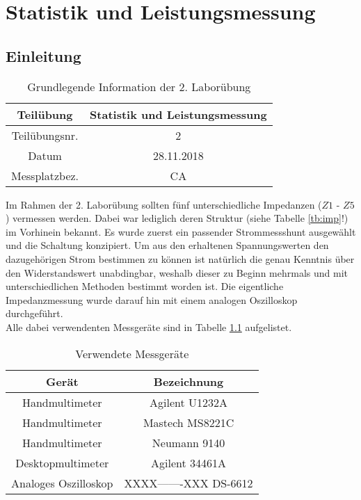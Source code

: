 \chapter{Statistik und Leistungsmessung}
\section{Einleitung}
\begin{table}[h]
	\centering
	\begin{tabular}{|c|c|}
		\hline 
		Teilübung 	& Statistik und Leistungsmessung \\
		\hline 
		Teilübungsnr. 		& 2	 \\ 
		\hline 
		Datum 		& 28.11.2018 \\ 
		\hline 
		Messplatzbez. 	& CA \\
		\hline
	\end{tabular} 
	\caption{Grundlegende Information der 2. Laborübung}
\end{table}
\noindent
Im Rahmen der 2. Laborübung sollten fünf unterschiedliche Impedanzen ($Z1$ - $Z5$) vermessen werden. Dabei war lediglich deren Struktur (siehe Tabelle \ref{tb:imp}!) im Vorhinein bekannt. Es wurde zuerst ein passender Strommessshunt ausgewählt und die Schaltung konzipiert. Um aus den erhaltenen Spannungswerten den dazugehörigen Strom bestimmen zu können ist natürlich die genau Kenntnis über den Widerstandswert unabdingbar, weshalb dieser zu Beginn mehrmals und mit unterschiedlichen Methoden bestimmt worden ist. Die eigentliche Impedanzmessung wurde darauf hin mit einem analogen Oszilloskop durchgeführt. \\
Alle dabei verwendenten Messgeräte sind in Tabelle \ref{tb:messgeraete} aufgelistet.
\begin{table}[h]
	\begin{tabular}{|c|c|}
	\hline 
	Gerät & Bezeichnung \\ 
	\hline 
	Handmultimeter & Agilent U1232A \\ 
	\hline 
	Handmultimeter & Mastech MS8221C \\ 
	\hline 
	Handmultimeter & Neumann 9140 \\ 
	\hline 
	Desktopmultimeter & Agilent 34461A \\ 
	\hline 
	Analoges Oszilloskop & XXXX-------XXX DS-6612 \\ 
	\hline 
	\end{tabular} 
	\centering
	\caption{Verwendete Messgeräte}
	\label{tb:messgeraete}
\end{table}

